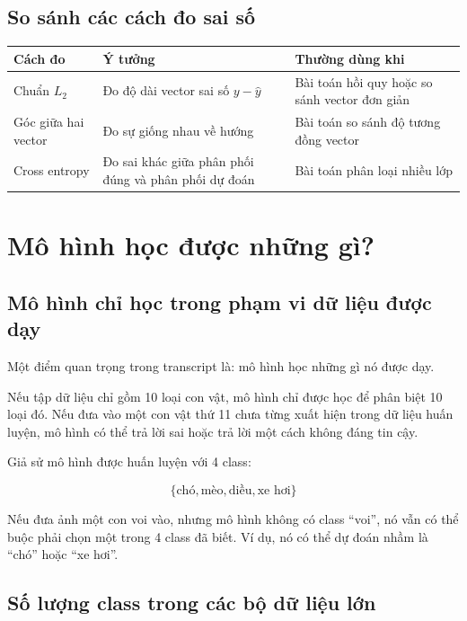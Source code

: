 \documentclass[12pt,a4paper]{report}
\begin{document}
\section{So sánh các cách đo sai số}

\begin{center}
\begin{tabular}{p{}p{}p{}}
\toprule
Cách đo & Ý tưởng & Thường dùng khi \\
\midrule
Chuẩn $L_2$ & Đo độ dài vector sai số $y-\hat{y}$ & Bài toán hồi quy hoặc so sánh vector đơn giản \\
Góc giữa hai vector & Đo sự giống nhau về hướng & Bài toán so sánh độ tương đồng vector \\
Cross entropy & Đo sai khác giữa phân phối đúng và phân phối dự đoán & Bài toán phân loại nhiều lớp \\
\bottomrule
\end{tabular}
\end{center}

\chapter{Mô hình học được những gì?}

\section{Mô hình chỉ học trong phạm vi dữ liệu được dạy}

Một điểm quan trọng trong transcript là: mô hình học những gì nó được dạy.

Nếu tập dữ liệu chỉ gồm 10 loại con vật, mô hình chỉ được học để phân biệt 10 loại đó. Nếu đưa vào một con vật thứ 11 chưa từng xuất hiện trong dữ liệu huấn luyện, mô hình có thể trả lời sai hoặc trả lời một cách không đáng tin cậy.

\begin{vidu}
Giả sử mô hình được huấn luyện với 4 class:

\[
    \{\text{chó},\text{mèo},\text{diều},\text{xe hơi}\}
\]

Nếu đưa ảnh một con voi vào, nhưng mô hình không có class ``voi'', nó vẫn có thể buộc phải chọn một trong 4 class đã biết. Ví dụ, nó có thể dự đoán nhầm là ``chó'' hoặc ``xe hơi''.
\end{vidu}

\section{Số lượng class trong các bộ dữ liệu lớn}
\end{document}
